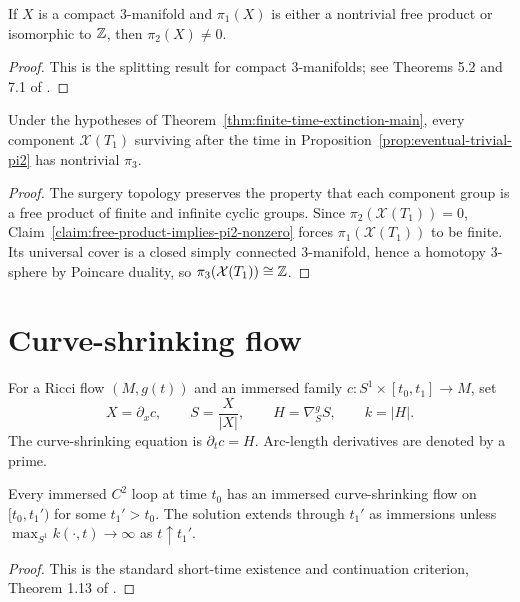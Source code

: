 \begin{claim}
\label{claim:free-product-implies-pi2-nonzero}
If $X$ is a compact $3$-manifold and $\pi_1(X)$ is either a nontrivial free
product or isomorphic to $\mathbb{Z}$, then $\pi_2(X)\ne0$.
\end{claim}
\begin{proof}
\sketch This is the splitting result for compact $3$-manifolds; see
Theorems 5.2 and 7.1 of \cite{Hempel}.
\end{proof}

\begin{claim}
\label{claim:x-t1-nontrivial-pi3}
Under the hypotheses of Theorem~\ref{thm:finite-time-extinction-main}, every
component ${\mathcal X}(T_1)$ surviving after the time in
Proposition~\ref{prop:eventual-trivial-pi2} has nontrivial $\pi_3$.
\end{claim}
\begin{proof}
\sketch The surgery topology preserves the property that each component group
is a free product of finite and infinite cyclic groups. Since
$\pi_2({\mathcal X}(T_1))=0$, Claim~\ref{claim:free-product-implies-pi2-nonzero}
forces $\pi_1({\mathcal X}(T_1))$ to be finite. Its universal cover is a closed
simply connected $3$-manifold, hence a homotopy $3$-sphere by Poincare duality,
so $\pi_3({\mathcal X}(T_1))\cong\mathbb{Z}$.
\end{proof}

\section{Curve-shrinking flow}
\label{sect:csf}

For a Ricci flow $(M,g(t))$ and an immersed family
$c\colon S^1\times[t_0,t_1]\to M$, set
\[
X=\partial_xc,\qquad S=\frac X{|X|},\qquad
H=\nabla^g_SS,\qquad k=|H|.
\]
The curve-shrinking equation is $\partial_tc=H$. Arc-length derivatives are
denoted by a prime.

\begin{claim}
\label{claim:curve-shrinking-short-time-existence}
\label{curvshrexist}

Every immersed $C^2$ loop at time $t_0$ has an immersed curve-shrinking flow
on $[t_0,t_1')$ for some $t_1'>t_0$. The solution extends through $t_1'$ as
immersions unless $\max_{S^1}k(\cdot,t)\to\infty$ as $t\uparrow t_1'$.
\end{claim}
\begin{proof}
\sketch This is the standard short-time existence and continuation criterion,
Theorem 1.13 of \cite{AG}.
\end{proof}

